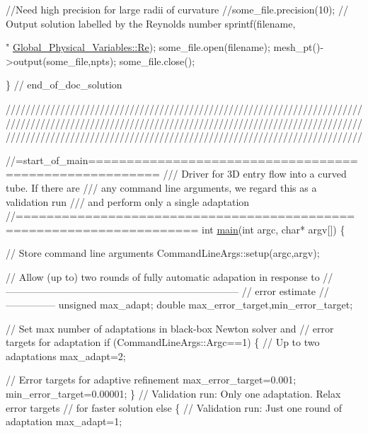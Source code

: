 \begin{DoxyCodeInclude}
 \textcolor{comment}{//Need high precision for large radii of curvature}
 \textcolor{comment}{//some\_file.precision(10);}
 \textcolor{comment}{// Output solution labelled by the Reynolds number}
 sprintf(filename,\textcolor{stringliteral}{"%
         \hyperlink{namespaceGlobal__Physical__Variables_ab814e627d2eb5bc50318879d19ab16b9}{Global\_Physical\_Variables::Re});
 some\_file.open(filename);
 mesh\_pt()->output(some\_file,npts);
 some\_file.close();

\} \textcolor{comment}{// end\_of\_doc\_solution}

 

\textcolor{comment}{}
\textcolor{comment}{////////////////////////////////////////////////////////////////////////}
\textcolor{comment}{////////////////////////////////////////////////////////////////////////}
\textcolor{comment}{////////////////////////////////////////////////////////////////////////}
\textcolor{comment}{}

\textcolor{comment}{//=start\_of\_main=======================================================}\textcolor{comment}{}
\textcolor{comment}{/// Driver for 3D entry flow into a curved tube. If there are}
\textcolor{comment}{/// any command line arguments, we regard this as a validation run}
\textcolor{comment}{/// and perform only a single adaptation}
\textcolor{comment}{}\textcolor{comment}{//=====================================================================}
\textcolor{keywordtype}{int} \hyperlink{curved__pipe_8cc_a0ddf1224851353fc92bfbff6f499fa97}{main}(\textcolor{keywordtype}{int} argc, \textcolor{keywordtype}{char}* argv[]) 
\{

 \textcolor{comment}{// Store command line arguments}
 CommandLineArgs::setup(argc,argv);

 \textcolor{comment}{// Allow (up to) two rounds of fully automatic adapation in response to }
 \textcolor{comment}{//-----------------------------------------------------------------------}
 \textcolor{comment}{// error estimate}
 \textcolor{comment}{//---------------}
 \textcolor{keywordtype}{unsigned} max\_adapt;
 \textcolor{keywordtype}{double} max\_error\_target,min\_error\_target;

 \textcolor{comment}{// Set max number of adaptations in black-box Newton solver and}
 \textcolor{comment}{// error targets for adaptation}
 \textcolor{keywordflow}{if} (CommandLineArgs::Argc==1)
  \{
   \textcolor{comment}{// Up to two adaptations}
   max\_adapt=2;

   \textcolor{comment}{// Error targets for adaptive refinement}
   max\_error\_target=0.001;
   min\_error\_target=0.00001;
  \} 
 \textcolor{comment}{// Validation run: Only one adaptation. Relax error targets}
 \textcolor{comment}{// for faster solution}
 \textcolor{keywordflow}{else}
  \{
   \textcolor{comment}{// Validation run: Just one round of adaptation}
   max\_adapt=1;
   
}
\end{DoxyCodeInclude}
